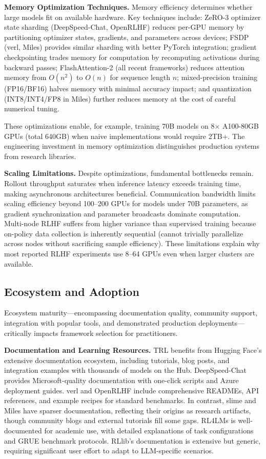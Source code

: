 \documentclass[conference]{IEEEtran}
\begin{document}
\textbf{Memory Optimization Techniques.} Memory efficiency determines whether large models fit on available hardware. Key techniques include: ZeRO-3 optimizer state sharding (DeepSpeed-Chat, OpenRLHF) reduces per-GPU memory by partitioning optimizer states, gradients, and parameters across devices; FSDP (verl, Miles) provides similar sharding with better PyTorch integration; gradient checkpointing trades memory for computation by recomputing activations during backward passes; FlashAttention-2 (all recent frameworks) reduces attention memory from $O(n^2)$ to $O(n)$ for sequence length $n$; mixed-precision training (FP16/BF16) halves memory with minimal accuracy impact; and quantization (INT8/INT4/FP8 in Miles) further reduces memory at the cost of careful numerical tuning.

These optimizations enable, for example, training 70B models on 8× A100-80GB GPUs (total 640GB) when naive implementations would require 2TB+. The engineering investment in memory optimization distinguishes production systems from research libraries.

\textbf{Scaling Limitations.} Despite optimizations, fundamental bottlenecks remain. Rollout throughput saturates when inference latency exceeds training time, making asynchronous architectures beneficial. Communication bandwidth limits scaling efficiency beyond 100–200 GPUs for models under 70B parameters, as gradient synchronization and parameter broadcasts dominate computation. Multi-node RLHF suffers from higher variance than supervised training because on-policy data collection is inherently sequential (cannot trivially parallelize across nodes without sacrificing sample efficiency). These limitations explain why most reported RLHF experiments use 8–64 GPUs even when larger clusters are available.

\subsection{Ecosystem and Adoption}

Ecosystem maturity—encompassing documentation quality, community support, integration with popular tools, and demonstrated production deployments—critically impacts framework selection for practitioners.

\textbf{Documentation and Learning Resources.} TRL benefits from Hugging Face's extensive documentation ecosystem, including tutorials, blog posts, and integration examples with thousands of models on the Hub. DeepSpeed-Chat provides Microsoft-quality documentation with one-click scripts and Azure deployment guides. verl and OpenRLHF include comprehensive READMEs, API references, and example recipes for standard benchmarks. In contrast, slime and Miles have sparser documentation, reflecting their origins as research artifacts, though community blogs and external tutorials fill some gaps. RL4LMs is well-documented for academic use, with detailed explanations of task configurations and GRUE benchmark protocols. RLlib's documentation is extensive but generic, requiring significant user effort to adapt to LLM-specific scenarios.
\end{document}

